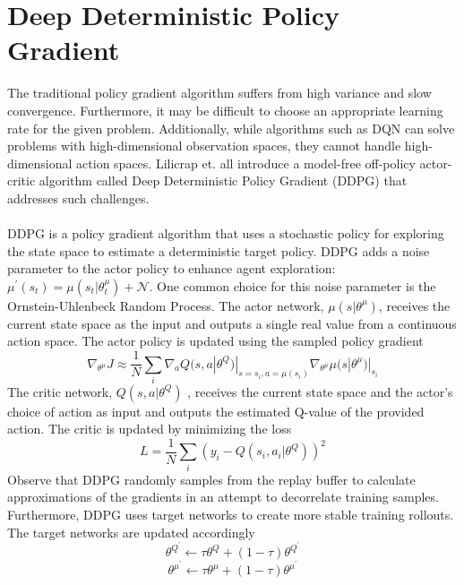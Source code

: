 \documentclass[journal,onecolumn]{IEEEtran}
\begin{document}
\section{Deep Deterministic Policy Gradient}
The traditional policy gradient algorithm suffers from high variance and slow convergence. Furthermore, it may be difficult to choose an appropriate learning rate for the given problem. Additionally, while algorithms such as DQN can solve problems with high-dimensional observation spaces, they cannot handle high-dimensional action spaces. Lilicrap et. all introduce a model-free off-policy actor-critic algorithm called Deep Deterministic Policy Gradient (DDPG) that addresses such challenges. \\\\
DDPG is a policy gradient algorithm that uses a stochastic policy for exploring the state space to estimate a deterministic target policy. DDPG adds a noise parameter to the actor policy to enhance agent exploration: $\mu^{'}(s_{t}) = \mu(s_{t}|\theta_{t}^{\mu}) + \mathcal{N}$. One common choice for this noise parameter is the Ornstein-Uhlenbeck Random Process. The actor network, $\mu(s|\theta^{μ})$, receives the current state space as the input and outputs a single real value from a continuous action space. The actor policy is updated using the sampled policy gradient
\[
\nabla_{\theta^{\mu}}J \approx \frac{1}{N}\sum_{i}\nabla_{a}Q(s, a|\theta^{Q})|_{s=s_{i}, a=\mu(s_{i})}\nabla_{\theta^{\mu}}\mu(s|\theta^{\mu})|_{s_{i}}
\]
The critic network, $Q(s,a|\theta^{Q})$ , receives the current state space and the actor’s choice of action as input and outputs the estimated Q-value of the provided action. The critic is updated by minimizing the loss 
\[
L = \frac{1}{N}\sum_{i}(y_{i} - Q(s_{i}, a_{i}|\theta^{Q}))^{2}
\]
Observe that DDPG randomly samples from the replay buffer to calculate approximations of the gradients in an attempt to decorrelate training samples. Furthermore, DDPG uses target networks to create more stable training rollouts. The target networks are updated accordingly
\[
\theta^{Q^{'}} \gets \tau\theta^{Q} + (1-\tau)\theta^{Q^{'}}
\]
\[
\theta^{\mu^{'}} \gets \tau\theta^{\mu} + (1-\tau)\theta^{\mu^{'}}
\]
\end{document}
